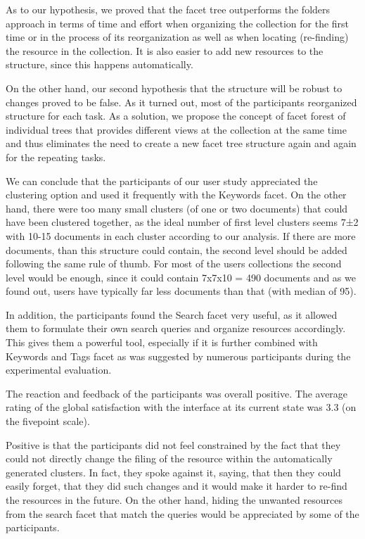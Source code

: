 \documentclass{article}
\begin{document}
As to our hypothesis, we proved that the facet tree outperforms the folders approach in terms of time and effort when organizing the collection for the first time or in the process of its reorganization as well as when locating (re-finding) the resource in the collection. It is also easier to add new resources to the structure, since this happens automatically.  

On the other hand, our second hypothesis that the structure will be robust to changes proved to be false. As it turned out, most of the participants reorganized structure for each task. As a solution, we propose the concept of facet forest of individual trees that provides different views at the collection at the same time and thus eliminates the need to create a new facet tree structure again and again for the repeating tasks.

 We can conclude that the participants of our user study appreciated the clustering option and used it frequently with the Keywords facet. On the other hand, there were too many small clusters (of one or two documents) that could have been clustered together, as the ideal number of first level clusters seems 7±2 with 10-15 documents in each cluster according to our analysis. If there are more documents, than this structure could contain, the second level should be added following the same rule of thumb. For most of the users collections the second level would be enough, since it could contain 7x7x10 =  490 documents and as we found out, users have typically far less documents than that (with median of 95).

 In addition, the participants found the Search facet very useful, as it allowed them to formulate their own search queries and organize resources accordingly. This gives them a powerful tool, especially if it is further combined with Keywords and Tags facet as was suggested by numerous participants during the experimental evaluation.
 
 The reaction and feedback of the participants was overall positive. The average rating of the global satisfaction with the interface at its current state was 3.3 (on the fivepoint scale). 
 
  Positive is that the participants did not feel constrained by the fact that they could not directly change the filing of the resource within the automatically generated clusters. In fact, they spoke against it, saying, that then they could easily forget, that they did such changes and it would make it harder to re-find the resources in the future. On the other hand, hiding the unwanted resources from the search facet that match the queries would be appreciated by some of the participants.
 
\end{document}
